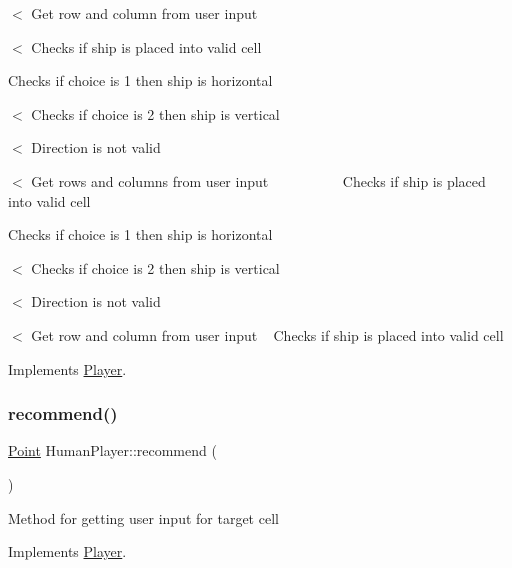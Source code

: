 $<$ Get row and column from user input

$<$ Checks if ship is placed into valid cell

Checks if choice is 1 then ship is horizontal

$<$ Checks if choice is 2 then ship is vertical

$<$ Direction is not valid

$<$ Get rows and columns from user input ~\newline
~\newline
~\newline
~\newline
~\newline
~\newline
 Checks if ship is placed into valid cell

Checks if choice is 1 then ship is horizontal

$<$ Checks if choice is 2 then ship is vertical

$<$ Direction is not valid

$<$ Get row and column from user input ~\newline
 Checks if ship is placed into valid cell 

Implements \mbox{\hyperlink{class_player_ab89c1180c7314d3e19bcf4b2bed2e02a}{Player}}.

\mbox{\label{class_human_player_a718f16f3ddeeb34c9f2e93cf1d805b46}} 
\subsubsection{\texorpdfstring{recommend()}{recommend()}}
{\footnotesize\ttfamily \mbox{\hyperlink{class_point}{Point}} Human\+Player\+::recommend (\begin{DoxyParamCaption}{ }\end{DoxyParamCaption})\hspace{0.3cm}{\ttfamily [virtual]}}

Method for getting user input for target cell 

Implements \mbox{\hyperlink{class_player_a2cc7a83d11158eafd8d49d4b9f23ce56}{Player}}.

\mbox{\label{class_human_player_a16b18f42e02d7c8d1f0971ce5e91595f}} 
